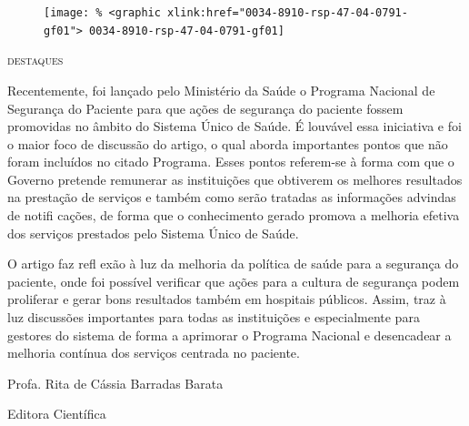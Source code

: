 \documentclass{article}
\begin{document}
\begin{figure}
\texttt{[image: \% <graphic xlink:href="0034-8910-rsp-47-04-0791-gf01">
0034-8910-rsp-47-04-0791-gf01]}
\caption{}\label{fig:f01}
\end{figure}


\textsc{destaques}

Recentemente, foi lançado pelo Ministério da Saúde o Programa Nacional de Segurança do
        Paciente para que ações de segurança do paciente fossem promovidas no âmbito do Sistema
        Único de Saúde. É louvável essa iniciativa e foi o maior foco de discussão do artigo, o qual
        aborda importantes pontos que não foram incluídos no citado Programa. Esses pontos
        referem-se à forma com que o Governo pretende remunerar as instituições que obtiverem os
        melhores resultados na prestação de serviços e também como serão tratadas as informações
        advindas de notifi cações, de forma que o conhecimento gerado promova a melhoria efetiva dos
        serviços prestados pelo Sistema Único de Saúde.

O artigo faz refl exão à luz da melhoria da política de saúde para a segurança do paciente,
        onde foi possível verificar que ações para a cultura de segurança podem proliferar e gerar
        bons resultados também em hospitais públicos. Assim, traz à luz discussões importantes para
        todas as instituições e especialmente para gestores do sistema de forma a aprimorar o
        Programa Nacional e desencadear a melhoria contínua dos serviços centrada no paciente.

Profa. Rita de Cássia Barradas Barata

Editora Científica
\end{document}
